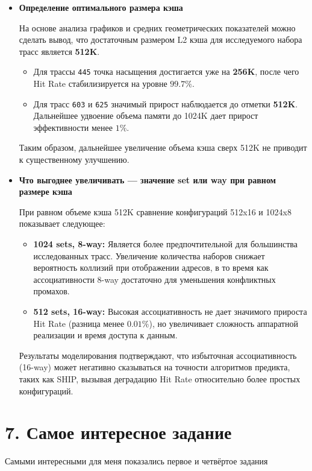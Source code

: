 \documentclass[11pt,a4paper]{article}
\begin{document}
\begin{itemize}
\begin{itemize}
\end{itemize}


\textbf{Итог:} Включение префетчера SPP оправдано только в условиях жесткого дефицита памяти (128K). В остальных случаях агрессивные предсказания префетчера засоряют кэш данными, которые не используются повторно, что снижает общую эффективность системы.

\item \textbf{Определение оптимального размера кэша}

На основе анализа графиков и средних геометрических показателей можно сделать вывод, что достаточным размером L2 кэша для исследуемого набора трасс является \textbf{512K}. 

\begin{itemize}
    \item Для трассы \texttt{445} точка насыщения достигается уже на \textbf{256K}, после чего Hit Rate стабилизируется на уровне $99.7\%$.
    \item Для трасс \texttt{603} и \texttt{625} значимый прирост наблюдается до отметки \textbf{512K}. Дальнейшее удвоение объема памяти до 1024K дает прирост эффективности менее $1\%$.
\end{itemize}

Таким образом, дальнейшее увеличение объема кэша сверх 512K не приводит к существенному улучшению.

\item \textbf{Что выгоднее увеличивать — значение set или way при равном размере кэша}

При равном объеме кэша 512K сравнение конфигураций 512x16 и 1024x8 показывает следующее:

\begin{itemize}
    \item \textbf{1024 sets, 8-way:} Является более предпочтительной для большинства исследованных трасс. Увеличение количества наборов снижает вероятность коллизий при отображении адресов, в то время как ассоциативности 8-way достаточно для уменьшения конфликтных промахов.
    \item \textbf{512 sets, 16-way:} Высокая ассоциативность не дает значимого прироста Hit Rate (разница менее $0.01\%$), но увеличивает сложность аппаратной реализации и время доступа к данным.
\end{itemize}

Результаты моделирования подтверждают, что избыточная ассоциативность (16-way) может негативно сказываться на точности алгоритмов предикта, таких как SHIP, вызывая деградацию Hit Rate относительно более простых конфигураций.
    
\end{itemize}

\section*{7. Самое интересное задание}

Самыми интересными для меня показались первое и четвёртое задания
\end{document}
